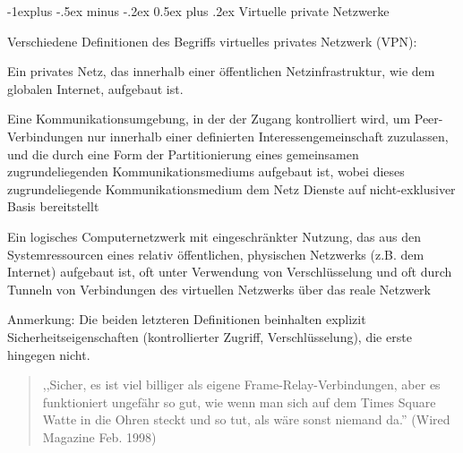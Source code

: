 \documentclass[a4paper]{article}
\makeatletter
\renewcommand{\subsection}{\@startsection{subsection}{2}{0mm}%
 {-1explus -.5ex minus -.2ex}%
 {0.5ex plus .2ex}%
 {\normalfont\normalsize\bfseries}}
\makeatother
\begin{document}
\begin{multicols}{3}
      \subsection{Virtuelle private Netzwerke}
      \begin{itemize*}
            \item Verschiedene Definitionen des Begriffs virtuelles privates Netzwerk (VPN):
            \begin{itemize*}
                  \item Ein privates Netz, das innerhalb einer öffentlichen Netzinfrastruktur, wie dem globalen Internet, aufgebaut ist.
                  \item Eine Kommunikationsumgebung, in der der Zugang kontrolliert wird, um Peer-Verbindungen nur innerhalb einer definierten Interessengemeinschaft zuzulassen, und die durch eine Form der Partitionierung eines gemeinsamen zugrundeliegenden Kommunikationsmediums aufgebaut ist, wobei dieses zugrundeliegende Kommunikationsmedium dem Netz Dienste auf nicht-exklusiver Basis bereitstellt
                  \item Ein logisches Computernetzwerk mit eingeschränkter Nutzung, das aus den Systemressourcen eines relativ öffentlichen, physischen Netzwerks (z.B. dem Internet) aufgebaut ist, oft unter Verwendung von Verschlüsselung und oft durch Tunneln von Verbindungen des virtuellen Netzwerks über das reale Netzwerk
                  \item Anmerkung: Die beiden letzteren Definitionen beinhalten explizit Sicherheitseigenschaften (kontrollierter Zugriff, Verschlüsselung), die erste hingegen nicht.
            \end{itemize*}
      \end{itemize*}

      \begin{quote}
            ,,Sicher, es ist viel billiger als eigene Frame-Relay-Verbindungen, aber es funktioniert ungefähr so gut, wie wenn man sich auf dem Times Square Watte in die Ohren steckt und so tut, als wäre sonst niemand da.'' (Wired Magazine Feb. 1998)
      \end{quote}


\end{multicols}
\end{document}

